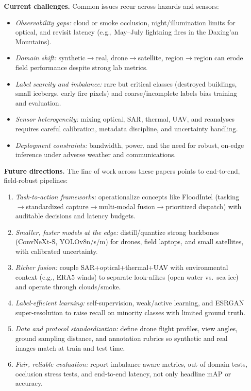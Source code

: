 \documentclass[conference,a4paper]{IEEEtran}
\begin{document}
\textbf{Current challenges.} Common issues recur across hazards and sensors:
\begin{itemize}
  \item \textit{Observability gaps:} cloud or smoke occlusion, night/illumination limits for optical, and revisit latency (e.g., May--July lightning fires in the Daxing’an Mountains).
  \item \textit{Domain shift:} synthetic$\rightarrow$real, drone$\rightarrow$satellite, region$\rightarrow$region can erode field performance despite strong lab metrics.
  \item \textit{Label scarcity and imbalance:} rare but critical classes (destroyed buildings, small icebergs, early fire pixels) and coarse/incomplete labels bias training and evaluation.
  \item \textit{Sensor heterogeneity:} mixing optical, SAR, thermal, UAV, and reanalyses requires careful calibration, metadata discipline, and uncertainty handling.
  \item \textit{Deployment constraints:} bandwidth, power, and the need for robust, on-edge inference under adverse weather and communications.
\end{itemize}

\textbf{Future directions.} The line of work across these papers points to end-to-end, field-robust pipelines:
\begin{enumerate}
  \item \textit{Task-to-action frameworks:} operationalize concepts like FloodIntel (tasking$\rightarrow$standardized capture$\rightarrow$multi-modal fusion$\rightarrow$prioritized dispatch) with auditable decisions and latency budgets.
  \item \textit{Smaller, faster models at the edge:} distill/quantize strong backbones (ConvNeXt-S, YOLOv8n/s/m) for drones, field laptops, and small satellites, with calibrated uncertainty.
  \item \textit{Richer fusion:} couple SAR+optical+thermal+UAV with environmental context (e.g., ERA5 winds) to separate look-alikes (open water vs.\ sea ice) and operate through clouds/smoke.
  \item \textit{Label-efficient learning:} self-supervision, weak/active learning, and ESRGAN super-resolution to raise recall on minority classes with limited ground truth.
  \item \textit{Data and protocol standardization:} define drone flight profiles, view angles, ground sampling distance, and annotation rubrics so synthetic and real images match at train and test time.
  \item \textit{Fair, reliable evaluation:} report imbalance-aware metrics, out-of-domain tests, occlusion stress tests, and end-to-end latency, not only headline mAP or accuracy.
\end{enumerate}
\end{document}
